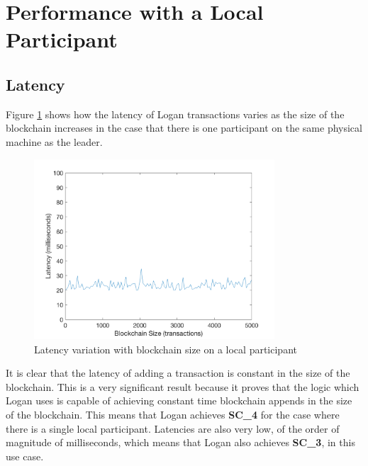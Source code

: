 \documentclass[12pt,a4paper,twoside,openright]{report}
\begin{document}
	\section{Performance with a Local Participant}
	\subsection{Latency}
	Figure \ref{fig:locallatency} shows how the latency of Logan transactions varies as the size of the blockchain increases in the case that there is one participant on the same physical machine as the leader. 
	\begin{figure}
		\centering
		\includegraphics[width=0.8\textwidth]{figs/local_latency_vs_size.png}
		\caption{Latency variation with blockchain size on a local participant}
		\label{fig:locallatency}
	\end{figure}
	It is clear that the latency of adding a transaction is constant in the size of the blockchain.
	This is a very significant result because it proves that the logic which Logan uses is capable of achieving constant time blockchain appends in the size of the blockchain.
	This means that Logan achieves \textbf{SC\_4} for the case where there is a single local participant.
	Latencies are also very low, of the order of magnitude of milliseconds, which means that Logan also achieves \textbf{SC\_3}, in this use case.\\
\end{document}
